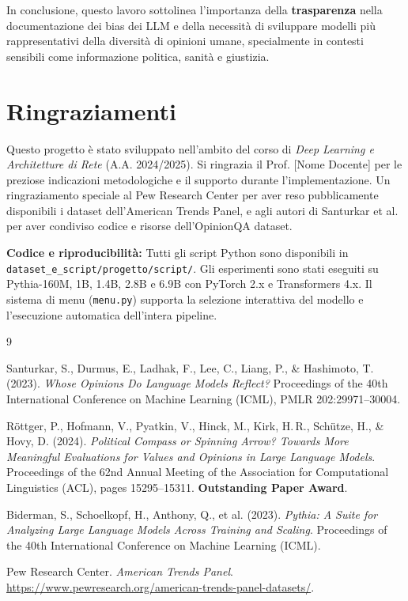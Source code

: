 \documentclass[../relazione.tex]{subfiles}
\begin{document}
\medskip
\noindent In conclusione, questo lavoro sottolinea l'importanza della \textbf{trasparenza} nella documentazione dei bias dei LLM e della necessità di sviluppare modelli più rappresentativi della diversità di opinioni umane, specialmente in contesti sensibili come informazione politica, sanità e giustizia.

\section*{Ringraziamenti}

Questo progetto è stato sviluppato nell'ambito del corso di \emph{Deep Learning e Architetture di Rete} (A.A. 2024/2025). Si ringrazia il Prof. [Nome Docente] per le preziose indicazioni metodologiche e il supporto durante l'implementazione. Un ringraziamento speciale al Pew Research Center per aver reso pubblicamente disponibili i dataset dell'American Trends Panel, e agli autori di Santurkar et al. per aver condiviso codice e risorse dell'OpinionQA dataset.

\medskip
\noindent \textbf{Codice e riproducibilità:} Tutti gli script Python sono disponibili in \texttt{dataset\_e\_script/progetto/script/}. Gli esperimenti sono stati eseguiti su Pythia-160M, 1B, 1.4B, 2.8B e 6.9B con PyTorch 2.x e Transformers 4.x. Il sistema di menu (\texttt{menu.py}) supporta la selezione interattiva del modello e l'esecuzione automatica dell'intera pipeline.

\newpage
\begin{thebibliography}{9}

Santurkar, S., Durmus, E., Ladhak, F., Lee, C., Liang, P., \& Hashimoto, T. (2023).
\emph{Whose Opinions Do Language Models Reflect?}
Proceedings of the 40th International Conference on Machine Learning (ICML), PMLR 202:29971--30004.

Röttger, P., Hofmann, V., Pyatkin, V., Hinck, M., Kirk, H.\,R., Schütze, H., \& Hovy, D. (2024).
\emph{Political Compass or Spinning Arrow? Towards More Meaningful Evaluations for Values and Opinions in Large Language Models}.
Proceedings of the 62nd Annual Meeting of the Association for Computational Linguistics (ACL), pages 15295--15311. \textbf{Outstanding Paper Award}.

Biderman, S., Schoelkopf, H., Anthony, Q., et al. (2023).
\emph{Pythia: A Suite for Analyzing Large Language Models Across Training and Scaling}.
Proceedings of the 40th International Conference on Machine Learning (ICML).

Pew Research Center.
\emph{American Trends Panel}.
\url{https://www.pewresearch.org/american-trends-panel-datasets/}.

\end{thebibliography}
\end{document}
